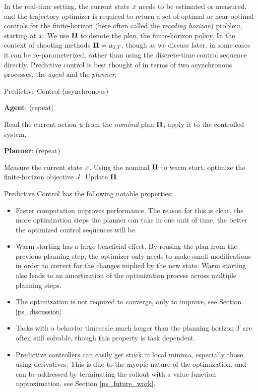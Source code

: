In the real-time setting, the current state ${x}$ needs to be estimated or measured, and the trajectory optimizer is required to return a set of optimal or near-optimal controls for the finite-horizon (here often called the \emph{receding horizon}) problem, starting at ${x}$. We use ${\mathbf{\Pi}}$ to denote the \emph{plan}, the finite-horizon policy. In the context of shooting methods ${\mathbf{\Pi}} = {u}_{0:T}$, though as we discuss later, in some cases it can be re-parameterized, rather than using the discrete-time control sequence directly. Predictive control is best thought of in terms of two asynchronous processes, the \emph{agent} and the \emph{planner}:

\begin{algorithm}[H]
	\caption{Predictive Control (asynchronous)}\label{ps_predictive_control}
	\textbf{Agent}: (repeat)
	\begin{algorithmic}[1]
		\State Read the current action ${u}$ from the \emph{nominal} plan ${\mathbf{\Pi}}$, apply it to the controlled system.
	\end{algorithmic}
	\textbf{Planner}: (repeat)
	\begin{algorithmic}[1]
		\State Measure the current state ${x}$.
		\State Using the nominal ${\mathbf{\Pi}}$ to warm start, optimize the finite-horizon objective ${J}$.
		\State Update ${\mathbf{\Pi}}$.
	\end{algorithmic}	
\end{algorithm}

Predictive Control has the following notable properties:
\begin{itemize}
	\item Faster computation improves performance. The reason for this is clear, the more optimization steps the planner can take in one unit of time, the better the optimized control sequences will be.
	\item Warm starting has a large beneficial effect. By reusing the plan from the previous planning step, the optimizer only needs to make small modifications in order to correct for the changes implied by the new state. Warm starting also leads to an amortization of the optimization process across multiple planning steps.
	\item The optimization is not required to converge, only to improve, see Section \ref{ps_discussion}.
	\item Tasks with a behavior timescale much longer than the planning horizon $T$ are often still solvable, though this property is task dependent.
	\item Predictive controllers can easily get stuck in local minima, especially those using derivatives. This is due to the myopic nature of the optimization, and can be addressed by terminating the rollout with a value function approximation, see Section \ref{ps_future_work}.
\end{itemize}

